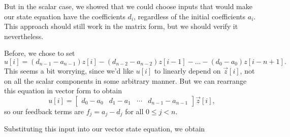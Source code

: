 \documentclass[letterpaper]{article}
\theoremstyle{remark}
\newcommand{\mat}[1]{\ensuremath{\begin{bmatrix}#1\end{bmatrix}}}
\begin{document}
But in the scalar case, we showed that we could choose inputs that would make our state equation have the coefficients $d_i$, regardless of the initial coefficients $a_i$. This approach should still work in the matrix form, but we should verify it nevertheless.

Before, we chose to set
\[
    u[i] = (d_{n-1} - a_{n-1})z[i] - (d_{n-2} - a_{n-2})z[i - 1] - \ldots - (d_0 - a_0)z[i - n + 1].
\]
This seems a bit worrying, since we'd like $u[i]$ to linearly depend on $\vec{z}[i]$, not on all the scalar components in some arbitrary manner. But we can rearrange this equation in vector form to obtain
\[
    u[i] = \mat{d_0 - a_0 & d_1 - a_1 & \cdots & d_{n-1} - a_{n-1}} \vec{z}[i],
\]
so our feedback terms are $f_j = a_j - d_j$ for all $0 \le j < n$.

Substituting this input into our vector state equation, we obtain
\end{document}

